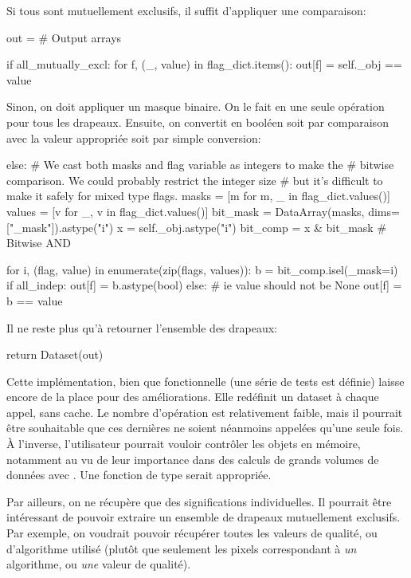 Si tous sont mutuellement exclusifs, il suffit d'appliquer une comparaison:
\begin{pythonMiddle}[]
    out = {}  # Output arrays

    if all_mutually_excl:
        for f, (_, value) in flag_dict.items():
            out[f] = self._obj == value
\end{pythonMiddle}

Sinon, on doit appliquer un masque binaire. On le fait en une seule opération pour tous les drapeaux.
Ensuite, on convertit en booléen soit par comparaison avec la valeur appropriée soit par simple conversion:
\begin{pythonMiddle}[]
    else:
        # We cast both masks and flag variable as integers to make the
        # bitwise comparison. We could probably restrict the integer size
        # but it's difficult to make it safely for mixed type flags.
        masks = [m for m, _ in flag_dict.values()]
        values = [v for _, v in flag_dict.values()]
        bit_mask = DataArray(masks, dims=["_mask"]).astype("i")
        x = self._obj.astype("i")
        bit_comp = x & bit_mask  # Bitwise AND

        for i, (flag, value) in enumerate(zip(flags, values)):
            b = bit_comp.isel(_mask=i)
            if all_indep:
                out[f] = b.astype(bool)
            else:  # ie value should not be None
                out[f] = b == value
\end{pythonMiddle}

Il ne reste plus qu'à retourner l'ensemble des drapeaux:
\begin{pythonLast}[]
    return Dataset(out)
\end{pythonLast}

Cette implémentation, bien que fonctionnelle (une série de tests est définie) laisse encore de la place pour des améliorations.
Elle redéfinit un dataset à chaque appel, sans cache. Le nombre d'opération est relativement faible, mais il pourrait être souhaitable que ces dernières ne soient néanmoins appelées qu'une seule fois.
À l'inverse, l'utilisateur pourrait vouloir contrôler les objets en mémoire, notamment au vu de leur importance dans des calculs de grands volumes de données avec . Une fonction de type  serait appropriée.

Par ailleurs, on ne récupère que des significations individuelles. Il pourrait être intéressant de pouvoir extraire un ensemble de drapeaux mutuellement exclusifs.
Par exemple, on voudrait pouvoir récupérer toutes les valeurs de qualité, ou d'algorithme utilisé (plutôt que seulement les pixels correspondant à \emph{un} algorithme, ou \emph{une} valeur de qualité).


